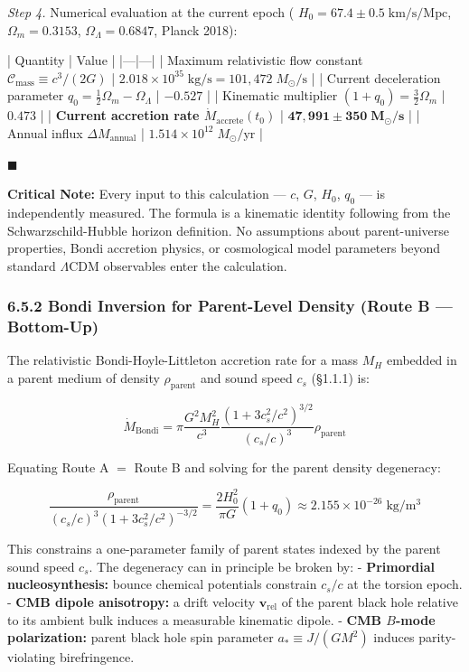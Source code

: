 \documentclass[11pt,a4paper]{article}
\theoremstyle{definition}
\theoremstyle{remark}
\begin{document}
\textit{Step 4.} Numerical evaluation at the current epoch ( $H_0 = 67.4 \pm 0.5 \; \mathrm{km/s/Mpc}$, $\Omega_m = 0.3153$, $\Omega_\Lambda = 0.6847$, Planck 2018):

| Quantity | Value |
|---|---|
| Maximum relativistic flow constant $\mathcal{C}_{\text{mass}} \equiv c^3/(2G)$ | $2.018 \times 10^{35} \; \mathrm{kg/s} = 101{,}472 \; M_\odot/\mathrm{s}$ |
| Current deceleration parameter $q_0 = \tfrac{1}{2}\Omega_m - \Omega_\Lambda$ | $-0.527$ |
| Kinematic multiplier $(1 + q_0) = \tfrac{3}{2}\Omega_m$ | $0.473$ |
| \textbf{Current accretion rate $\dot{M}_{\text{accrete}}(t_0)$} | $\mathbf{47{,}991 \pm 350 \; M_\odot/\text{s}}$ |
| Annual influx $\Delta M_{\text{annual}}$ | $1.514 \times 10^{12} \; M_\odot/\text{yr}$ |

$\blacksquare$

\textbf{Critical Note:} Every input to this calculation — $c$, $G$, $H_0$, $q_0$ — is independently measured. The formula is a kinematic identity following from the Schwarzschild-Hubble horizon definition. No assumptions about parent-universe properties, Bondi accretion physics, or cosmological model parameters beyond standard $\Lambda$CDM observables enter the calculation.

\subsubsection{6.5.2 Bondi Inversion for Parent-Level Density (Route B — Bottom-Up)}

The relativistic Bondi-Hoyle-Littleton accretion rate for a mass $M_H$ embedded in a parent medium of density $\rho_{\text{parent}}$ and sound speed $c_s$ (\S 1.1.1) is:


\begin{equation}
\dot{M}_{\text{Bondi}} = \pi \frac{G^2 M_H^2}{c^3} \frac{(1 + 3 c_s^2/c^2)^{3/2}}{(c_s/c)^3} \rho_{\text{parent}}
\end{equation}


Equating Route A $=$ Route B and solving for the parent density degeneracy:


\begin{equation}
\boxed{\frac{\rho_{\text{parent}}}{(c_s/c)^3 (1 + 3 c_s^2/c^2)^{-3/2}} = \frac{2 H_0^2}{\pi G}(1 + q_0) \approx 2.155 \times 10^{-26} \; \mathrm{kg/m^3}}
\end{equation}


This constrains a one-parameter family of parent states indexed by the parent sound speed $c_s$. The degeneracy can in principle be broken by:
- \textbf{Primordial nucleosynthesis:} bounce chemical potentials constrain $c_s / c$ at the torsion epoch.
- \textbf{CMB dipole anisotropy:} a drift velocity $\mathbf{v}_{\text{rel}}$ of the parent black hole relative to its ambient bulk induces a measurable kinematic dipole.
- \textbf{CMB $B$-mode polarization:} parent black hole spin parameter $a_* \equiv J/(GM^2)$ induces parity-violating birefringence.
\end{document}
